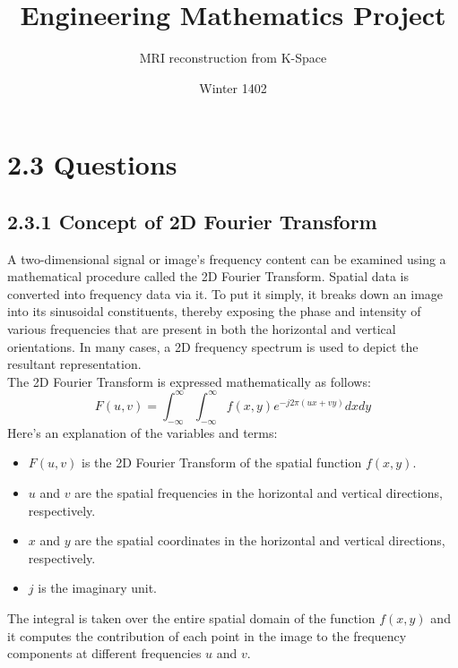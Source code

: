 \documentclass[12pt,fleqn]{article}
\title{Engineering Mathematics Project}
\subtitle{MRI reconstruction from K-Space}
\date{ Winter 1402 }
\begin{document}
\maketitlepage
\maketitlestart
{}
\section{2.3 Questions}
\subsection{2.3.1 Concept of 2D Fourier Transform}
A two-dimensional signal or image's frequency content can be examined using a mathematical procedure called the 2D Fourier Transform. Spatial data is converted into frequency data via it. To put it simply, it breaks down an image into its sinusoidal constituents, thereby exposing the phase and intensity of various frequencies that are present in both the horizontal and vertical orientations. In many cases, a 2D frequency spectrum is used to depict the resultant representation.
\\
The 2D Fourier Transform is expressed mathematically as follows:
\begin{equation}
    F(u,v) = \int_{-\infty}^{\infty} \int_{-\infty}^{\infty} f(x,y) e^{-j2\pi(ux+vy)} dxdy
\end{equation}
Here's an explanation of the variables and terms:
\begin{itemize}
    \item $F(u,v)$ is the 2D Fourier Transform of the spatial function $f(x,y)$.
    \item $u$ and $v$ are the spatial frequencies in the horizontal and vertical directions, respectively.
    \item $x$ and $y$ are the spatial coordinates in the horizontal and vertical directions, respectively.
    \item $j$ is the imaginary unit.
\end{itemize}
The integral is taken over the entire spatial domain of the function $f(x,y)$ and it computes the contribution of each point in the image to the frequency components at different frequencies $u$ and $v$.
\end{document}
